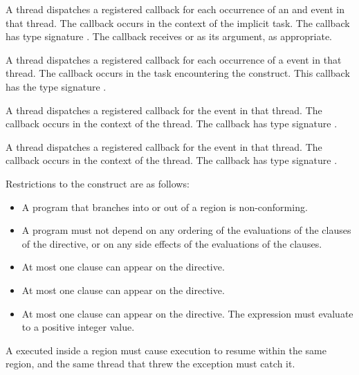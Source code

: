 A thread dispatches a registered 
callback for each occurrence of an  and 
 event in that thread. The callback occurs in the
context of the implicit task.  The callback has type signature
. The callback receives
 or 
as its  argument, as appropriate.

A thread dispatches a registered 
callback for each occurrence of a  event in that
thread.  The callback occurs in the task encountering
the  construct.  This callback has the type signature
.

A thread dispatches a registered 
callback for the  event in that thread.
The callback occurs in the
context of the thread.  The callback has type signature
.

A thread dispatches a registered 
callback for the  event in that thread.
The callback occurs in the context of the thread.  The callback has type signature
.

\restrictions
Restrictions to the  construct are as follows:

\begin{itemize}
\item A program that branches into or out of a  region is non-conforming.

\item A program must not depend on any ordering of the evaluations of the clauses of the
 directive, or on any side effects of the evaluations of the clauses.

\item At most one  clause can appear on the directive.

\item At most one  clause can appear on the directive.

\item At most one  clause can appear on the directive. The 
expression must evaluate to a positive integer value.
\end{itemize}

\begin{ccppspecific}
A  executed inside a  region must cause execution to resume
within the same  region, and the same thread that threw the exception
must catch it.
\end{ccppspecific}

